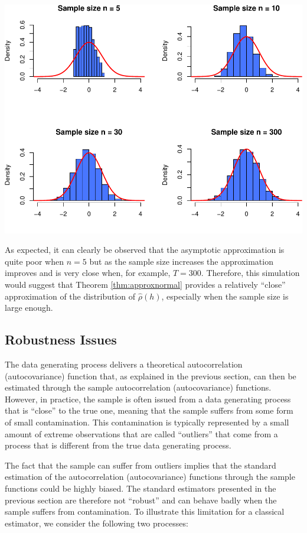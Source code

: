 \documentclass[]{book}
\theoremstyle{definition}
\theoremstyle{definition}
\theoremstyle{definition}
\theoremstyle{remark}
\begin{document}
\includegraphics{ts_files/figure-latex/simulationACF-1.pdf}

As expected, it can clearly be observed that the asymptotic
approximation is quite poor when \(n = 5\) but as the sample size
increases the approximation improves and is very close when, for
example, \(T = 300\). Therefore, this simulation would suggest that
Theorem \ref{thm:approxnormal} provides a relatively ``close''
approximation of the distribution of \(\hat{\rho}(h)\), especially when
the sample size is large enough.

\hypertarget{robustness-issues}{%
\subsection{Robustness Issues}\label{robustness-issues}}

The data generating process delivers a theoretical autocorrelation
(autocovariance) function that, as explained in the previous section,
can then be estimated through the sample autocorrelation
(autocovariance) functions. However, in practice, the sample is often
issued from a data generating process that is ``close'' to the true one,
meaning that the sample suffers from some form of small contamination.
This contamination is typically represented by a small amount of extreme
observations that are called ``outliers'' that come from a process that
is different from the true data generating process.

The fact that the sample can suffer from outliers implies that the
standard estimation of the autocorrelation (autocovariance) functions
through the sample functions could be highly biased. The standard
estimators presented in the previous section are therefore not
``robust'' and can behave badly when the sample suffers from
contamination. To illustrate this limitation for a classical estimator,
we consider the following two processes:
\end{document}
